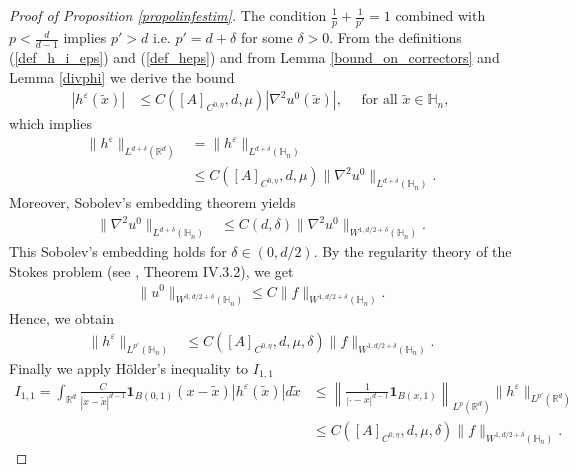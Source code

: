 \documentclass[11pt, reqno]{amsart}
\theoremstyle{definition}
\theoremstyle{remark}
\numberwithin{equation}{section}
\begin{document}
\begin{proof}[Proof of Proposition \textup{\ref{propolinfestim}}]
		\noindent	The condition $\frac{1}{p}+\frac{1}{p'}=1$ combined with $p<\frac{d}{d-1}$  implies  $p'>d$ i.e. $p'=d+\delta$ for some $\delta>0$.
		From the definitions (\ref{def_h_i_eps}) and (\ref{def_heps}) and from Lemma \ref{bound_on_correctors} and Lemma \ref{divphi} we derive the bound
		\begin{align}\label{bound_h_nab2u}
			|h^\varepsilon(\tilde{x})|&\leq C ([A]_{C^{0,\eta}},d,\mu)|\nabla^2 u^0(\tilde{x})|, \quad \mbox{ for all } \tilde{x}\in \mathbb{H}_n,
		\end{align}
		which implies
		\begin{align*}
			\|h^\varepsilon \|_{L^{d+\delta}(\mathbb{R}^d)}&=\|h^\varepsilon \|_{L^{d+\delta}(\mathbb{H}_n)}\\&\leq C([A]_{C^{0,\eta}},d,\mu)	\|\nabla^2 u^0 \|_{L^{d+\delta}(\mathbb{H}_n)}.
		\end{align*}
		Moreover, Sobolev's embedding theorem yields 
		\begin{align*}
			\|\nabla^2 u^0 \|_{L^{d+\delta}(\mathbb{H}_n)}
			& \leq C(d, \delta) 	 \|\nabla^2 u^0\|_{W^{1,d/2+\delta}(\mathbb{H}_n)}.
		\end{align*}
		This Sobolev's embedding holds for $\delta\in(0,d/2)$.
		By the regularity theory of the Stokes problem (see \cite{Gld}, Theorem IV.3.2), we get
		\begin{align*}
			\|u^0\|_{W^{3,d/2+\delta}(\mathbb{H}_n)}\leq C \|f\|_{W^{1,	d/2+\delta}(\mathbb{H}_n)}.
		\end{align*}
		Hence, we obtain
		\begin{align*}
			\|h^\varepsilon \|_{L^{p'}(\mathbb{H}_n)}&\leq C([A]_{C^{0,\eta}},d,\mu, \delta)  \|f\|_{W^{1,d/2+\delta}(\mathbb{H}_n)}. 
		\end{align*}
		Finally we apply Hölder's inequality to $I_{1,1}$
		\begin{align*}
			I_{1,1}	=\int_{\mathbb{R}^d} \frac{C}{|x- \tilde{x}|^{d-1}} \mathbf{1}_{B(0,1)} (x- \tilde{x}) |h^\varepsilon(\tilde{x})| d\tilde{x} & \leq \left\| \frac{1}{| \cdot - x|^{d-1}}\mathbf{1}_{B(x,1)}  \right\|_{L^p(\mathbb{R}^d)}  \|h^\varepsilon\|_{L^{p'}(\mathbb{R}^d)}	\\
			&\leq  C([A]_{C^{0,\eta}},d,\mu, \delta)  \|f\|_{W^{1,d/2+\delta}(\mathbb{H}_n)}.
		\end{align*}
		

\end{proof}
\end{document}
